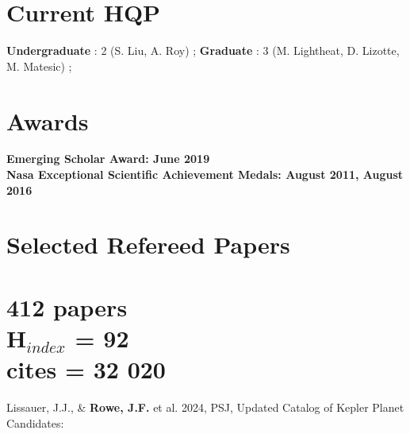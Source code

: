 \documentclass[margin,line]{res}
\newenvironment{list2}{
  \begin{list}{$\bullet$}{%
      \setlength{\itemsep}{0in}
      \setlength{\parsep}{0in} \setlength{\parskip}{0in}
      \setlength{\topsep}{0in} \setlength{\partopsep}{0in} 
      \setlength{\leftmargin}{0.2in}}}{\end{list}}
\begin{document}
\begin{resume}
\vspace*{-.1in}

\section{\sc Current HQP}
{\bf Undergraduate} : 2 (S. Liu, A. Roy) ; {\bf Graduate} : 3 (M. Lightheat, D. Lizotte, M. Matesic) ; %

\vspace*{-.1in}

\section{\sc Awards}
{\bf Emerging Scholar Award: June 2019}\\
\vspace*{-.15in}
\vspace*{-.15in}
{\bf Nasa Exceptional Scientific Achievement Medals: August 2011, August 2016}\\

\vspace*{.1in}

\section{\sc Selected Refereed Papers\\
\ \\
412 papers \\
H$_{index}$ = 92\\
cites = 32 020 \\
}



Lissauer, J.J., \& {\bf Rowe, J.F.} et al. 2024, PSJ, Updated Catalog of Kepler Planet Candidates: 


\end{resume}
\end{document}
